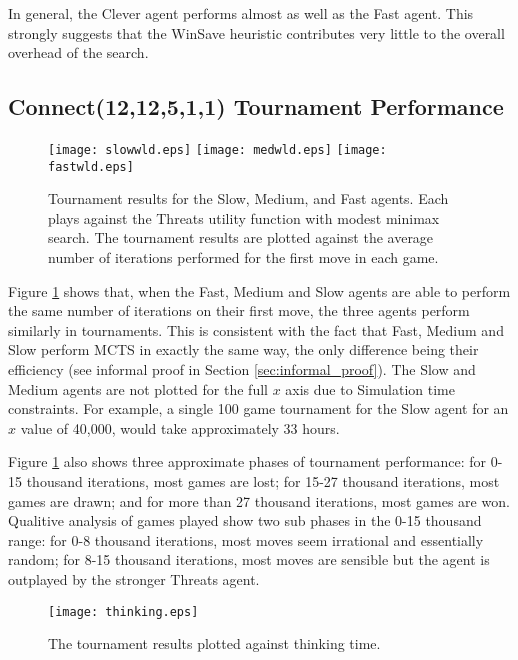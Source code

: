 In general, the {Clever} agent performs almost as well as the {Fast} agent. This strongly suggests that the {WinSave} heuristic contributes very little to the overall overhead of the search.



\subsection{{Connect}(12,12,5,1,1) Tournament Performance}

\begin{figure}
\centering
{\texttt{[image: slowwld.eps]}}
{\texttt{[image: medwld.eps]}}
{\texttt{[image: fastwld.eps]}}
\caption{Tournament results for the {Slow}, {Medium}, and {Fast} agents. Each plays against the {Threats} utility function with modest minimax search. The tournament results are plotted against the average number of iterations performed for the first move in each game.}
\label{fig:wld}
\end{figure}

Figure \ref{fig:wld} shows that, when the {Fast}, {Medium} and {Slow} agents are able to perform the same number of iterations on their first move, the three agents perform similarly in tournaments. This is consistent with the fact that {Fast}, {Medium} and {Slow} perform {MCTS} in exactly the same way, the only difference being their efficiency (see informal proof in Section \ref{sec:informal_proof}). The {Slow} and {Medium} agents are not plotted for the full $x$ axis due to Simulation time constraints. For example, a single 100 game tournament for the {Slow} agent for an $x$ value of 40,000, would take approximately 33 hours.

Figure \ref{fig:wld} also shows three approximate phases of tournament performance: for 0-15 thousand iterations, most games are lost; for 15-27 thousand iterations, most games are drawn; and for more than 27 thousand iterations, most games are won. Qualitive analysis of games played show two sub phases in the 0-15 thousand range: for 0-8 thousand iterations, most moves seem irrational and essentially random; for 8-15 thousand iterations, most moves are sensible but the agent is outplayed by the stronger {Threats} agent. 

\begin{figure}
\centering
{\texttt{[image: thinking.eps]}}
\caption{The tournament results plotted against thinking time.}
\label{fig:results}
\end{figure}

